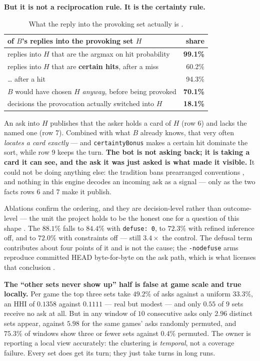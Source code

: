 \documentclass[11pt]{article}
\newcommand{\code}[1]{\texttt{#1}}
\begin{document}
\textbf{But it is not a reciprocation rule. It is the certainty rule.}

\begin{table}[ht]
\centering
\caption{What the reply into the provoking set actually is \cite{asking}.}
\label{tab:reply}
\small
\begin{tabular}{@{}p{}r@{}}
\toprule
of $B$'s replies into the provoking set $H$ & share \\
\midrule
replies into $H$ that are the argmax on hit probability & \textbf{99.1\%} \\
replies into $H$ that are \textbf{certain hits}, after a miss & 60.2\% \\
\quad \dots{} after a hit & 94.3\% \\
$B$ would have chosen $H$ \emph{anyway}, before being provoked & \textbf{70.1\%} \\
decisions the provocation actually switched into $H$ & \textbf{18.1\%} \\
\bottomrule
\end{tabular}
\end{table}

An ask into $H$ publishes that the asker holds a card of $H$ (row 6) and lacks the named
one (row 7). Combined with what $B$ already knows, that very often \emph{locates a card
exactly} --- and \code{certaintyBonus} makes a certain hit dominate the sort, while row 9
keeps the turn. \textbf{The bot is not asking back; it is taking a card it can see, and
the ask it was just asked is what made it visible.} It could not be doing anything else:
the tradition bans prearranged conventions \cite{develin}, and nothing in this engine
decodes an incoming ask as a signal --- only as the two facts rows 6 and 7 make it
publish.

Ablations confirm the ordering, and they are decision-level rather than
outcome-level --- the unit the project holds to be the honest one for a question of this
shape \cite{inertpaper}. The $88.1\%$ falls to $84.4\%$ with \mbox{\code{defuse: 0}}, to $72.3\%$
with refined inference off, and to $72.0\%$ with constraints off --- still $3.4\times$ the
control. The defusal term contributes about four points of it and is not the cause; the
\code{-nodefuse} arms reproduce committed HEAD byte-for-byte on the ask path, which is
what licenses that conclusion \cite{asking}.

\textbf{The ``other sets never show up'' half is false at game scale and true locally.}
Per game the top three sets take $49.2\%$ of asks against a uniform $33.3\%$, an HHI of
$0.1358$ against $0.1111$ --- real but modest --- and only $0.55$ of $9$ sets receive no
ask at all. But in any window of $10$ consecutive asks only $\mathbf{2.96}$ distinct sets
appear, against $\mathbf{5.98}$ for the same games' asks randomly permuted, and $75.3\%$
of windows show three or fewer sets against $0.4\%$ permuted. The owner is reporting a
local view accurately: the clustering is \emph{temporal}, not a coverage failure. Every
set does get its turn; they just take turns in long runs.
\end{document}
